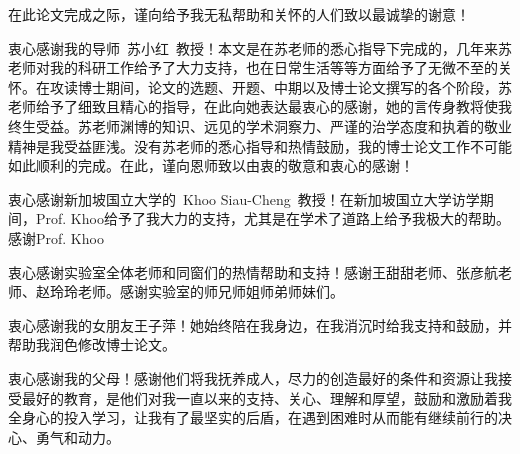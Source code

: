 

在此论文完成之际，谨向给予我无私帮助和关怀的人们致以最诚挚的谢意！

衷心感谢我的导师~苏小红~教授！本文是在苏老师的悉心指导下完成的，几年来苏老师对我的科研工作给予了大力支持，也在日常生活等等方面给予了无微不至的关怀。在攻读博士期间，论文的选题、开题、中期以及博士论文撰写的各个阶段，苏老师给予了细致且精心的指导，在此向她表达最衷心的感谢，她的言传身教将使我终生受益。苏老师渊博的知识、远见的学术洞察力、严谨的治学态度和执着的敬业精神是我受益匪浅。没有苏老师的悉心指导和热情鼓励，我的博士论文工作不可能如此顺利的完成。在此，谨向恩师致以由衷的敬意和衷心的感谢！

衷心感谢新加坡国立大学的~Khoo Siau-Cheng~教授！在新加坡国立大学访学期间，Prof. Khoo给予了我大力的支持，尤其是在学术了道路上给予我极大的帮助。感谢Prof. Khoo

衷心感谢实验室全体老师和同窗们的热情帮助和支持！感谢王甜甜老师、张彦航老师、赵玲玲老师。感谢实验室的师兄师姐师弟师妹们。



衷心感谢我的女朋友王子萍！她始终陪在我身边，在我消沉时给我支持和鼓励，并帮助我润色修改博士论文。

衷心感谢我的父母！感谢他们将我抚养成人，尽力的创造最好的条件和资源让我接受最好的教育，是他们对我一直以来的支持、关心、理解和厚望，鼓励和激励着我全身心的投入学习，让我有了最坚实的后盾，在遇到困难时从而能有继续前行的决心、勇气和动力。
